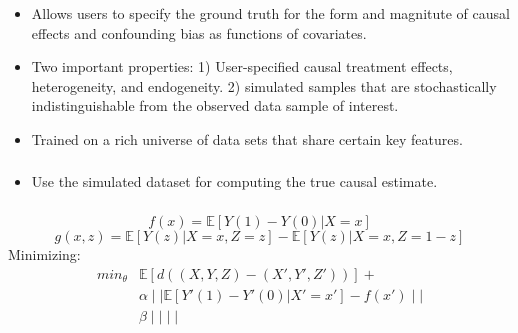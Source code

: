 \documentclass{beamer}
\begin{document}
\begin{frame}
	\frametitle{}
	\begin{itemize}

		\item Allows users to specify the ground truth for the form and magnitute of causal effects and confounding bias as functions of covariates.
		\item Two important properties: 1) User-specified causal treatment effects, heterogeneity, and endogeneity. 2) simulated samples that are stochastically indistinguishable from the observed data sample of interest.
		\item Trained on a rich universe of data sets that share certain key features.
	\end{itemize}
\end{frame}

\begin{frame}
	\frametitle{}
	\begin{itemize}
		\item Use the simulated dataset for computing the true causal estimate.
	\end{itemize}
\end{frame}

\begin{frame}
	\frametitle{}
	$$ f(x) = \mathbb{E}[Y(1) - Y(0)| X=x] $$
	$$ g(x, z) = \mathbb{E}[Y(z) | X=x, Z=z] - \mathbb{E}[Y(z) | X=x, Z=1-z ] $$
	Minimizing:
\begin{equation}
	\begin{split}
	\textit{min}_{\theta} & \mathbb{E}[d((X, Y, Z) - (X', Y', Z'))] + \\
			& \alpha \mid\mid \mathbb{E}[Y'(1) - Y'(0) | X'=x'] - f(x') \mid\mid \\
			& \beta \mid\mid \mid\mid
\end{split}
\end{equation}
\end{frame}
\end{document}
